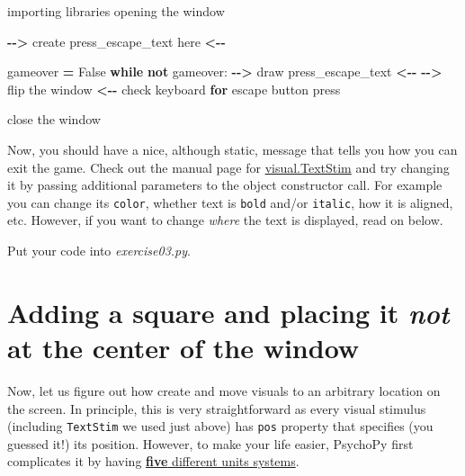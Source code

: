 \documentclass[
]{book}
\newenvironment{Shaded}{\begin{snugshade}}{\end{snugshade}}
\newcommand{\ControlFlowTok}[1]{\textcolor[rgb]{0.13,0.29,0.53}{\textbf{#1}}}
\newcommand{\KeywordTok}[1]{\textcolor[rgb]{0.13,0.29,0.53}{\textbf{#1}}}
\newcommand{\NormalTok}[1]{#1}
\newcommand{\OperatorTok}[1]{\textcolor[rgb]{0.81,0.36,0.00}{\textbf{#1}}}
\newcommand{\VariableTok}[1]{\textcolor[rgb]{0.00,0.00,0.00}{#1}}
\begin{document}
\begin{Shaded}
\begin{Highlighting}[]
\NormalTok{importing libraries}
\NormalTok{opening the window}

\OperatorTok{{-}{-}\textgreater{}}\NormalTok{ create press\_escape\_text here }\OperatorTok{\textless{}{-}{-}}

\NormalTok{gameover }\OperatorTok{=} \VariableTok{False}
\ControlFlowTok{while} \KeywordTok{not}\NormalTok{ gameover:}
    \OperatorTok{{-}{-}\textgreater{}}\NormalTok{ draw press\_escape\_text }\OperatorTok{\textless{}{-}{-}}
    \OperatorTok{{-}{-}\textgreater{}}\NormalTok{ flip the window  }\OperatorTok{\textless{}{-}{-}}
\NormalTok{    check keyboard }\ControlFlowTok{for}\NormalTok{ escape button press}
    
\NormalTok{close the window}
\end{Highlighting}
\end{Shaded}

Now, you should have a nice, although static, message that tells you how you can exit the game. Check out the manual page for \href{https://psychopy.org/api/visual/textstim.html}{visual.TextStim} and try changing it by passing additional parameters to the object constructor call. For example you can change its \texttt{color}, whether text is \texttt{bold} and/or \texttt{italic}, how it is aligned, etc. However, if you want to change \emph{where} the text is displayed, read on below.

Put your code into \emph{exercise03.py}.

\hypertarget{adding-a-square-and-placing-it-not-at-the-center-of-the-window}{%
\section{\texorpdfstring{Adding a square and placing it \emph{not} at the center of the window}{Adding a square and placing it not at the center of the window}}\label{adding-a-square-and-placing-it-not-at-the-center-of-the-window}}

Now, let us figure out how create and move visuals to an arbitrary location on the screen. In principle, this is very straightforward as every visual stimulus (including \texttt{TextStim} we used just above) has \texttt{pos} property that specifies (you guessed it!) its position. However, to make your life easier, PsychoPy first complicates it by having \href{https://psychopy.org/general/units.html}{\textbf{five} different units systems}.
\end{document}
